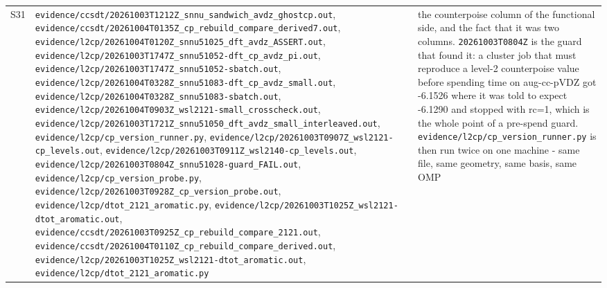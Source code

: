 \documentclass[11pt]{article}
\begin{document}
\begin{longtable}{c>{\raggedright\arraybackslash}p{}>{\raggedright\arraybackslash}p{}}
S31 & \texttt{evidence/\allowbreak{}ccsdt/\allowbreak{}20261003T1212Z\_\allowbreak{}snnu\_\allowbreak{}sandwich\_\allowbreak{}avdz\_\allowbreak{}ghostcp.out}, \texttt{evidence/\allowbreak{}ccsdt/\allowbreak{}20261004T0135Z\_\allowbreak{}cp\_\allowbreak{}rebuild\_\allowbreak{}compare\_\allowbreak{}derived7.out}, \texttt{evidence/\allowbreak{}l2cp/\allowbreak{}20261004T0120Z\_\allowbreak{}snnu51025\_\allowbreak{}dft\_\allowbreak{}avdz\_\allowbreak{}ASSERT.out}, \texttt{evidence/\allowbreak{}l2cp/\allowbreak{}20261003T1747Z\_\allowbreak{}snnu51052-dft\_\allowbreak{}cp\_\allowbreak{}avdz\_\allowbreak{}pi.out}, \texttt{evidence/\allowbreak{}l2cp/\allowbreak{}20261003T1747Z\_\allowbreak{}snnu51052-sbatch.out}, \texttt{evidence/\allowbreak{}l2cp/\allowbreak{}20261004T0328Z\_\allowbreak{}snnu51083-dft\_\allowbreak{}cp\_\allowbreak{}avdz\_\allowbreak{}small.out}, \texttt{evidence/\allowbreak{}l2cp/\allowbreak{}20261004T0328Z\_\allowbreak{}snnu51083-sbatch.out}, \texttt{evidence/\allowbreak{}l2cp/\allowbreak{}20261004T0903Z\_\allowbreak{}wsl2121-small\_\allowbreak{}crosscheck.out}, \texttt{evidence/\allowbreak{}l2cp/\allowbreak{}20261003T1721Z\_\allowbreak{}snnu51050\_\allowbreak{}dft\_\allowbreak{}avdz\_\allowbreak{}small\_\allowbreak{}interleaved.out}, \texttt{evidence/\allowbreak{}l2cp/\allowbreak{}cp\_\allowbreak{}version\_\allowbreak{}runner.py}, \texttt{evidence/\allowbreak{}l2cp/\allowbreak{}20261003T0907Z\_\allowbreak{}wsl2121-cp\_\allowbreak{}levels.out}, \texttt{evidence/\allowbreak{}l2cp/\allowbreak{}20261003T0911Z\_\allowbreak{}wsl2140-cp\_\allowbreak{}levels.out}, \texttt{evidence/\allowbreak{}l2cp/\allowbreak{}20261003T0804Z\_\allowbreak{}snnu51028-guard\_\allowbreak{}FAIL.out}, \texttt{evidence/\allowbreak{}l2cp/\allowbreak{}cp\_\allowbreak{}version\_\allowbreak{}probe.py}, \texttt{evidence/\allowbreak{}l2cp/\allowbreak{}20261003T0928Z\_\allowbreak{}cp\_\allowbreak{}version\_\allowbreak{}probe.out}, \texttt{evidence/\allowbreak{}l2cp/\allowbreak{}dtot\_\allowbreak{}2121\_\allowbreak{}aromatic.py}, \texttt{evidence/\allowbreak{}l2cp/\allowbreak{}20261003T1025Z\_\allowbreak{}wsl2121-dtot\_\allowbreak{}aromatic.out}, \texttt{evidence/\allowbreak{}ccsdt/\allowbreak{}20261003T0925Z\_\allowbreak{}cp\_\allowbreak{}rebuild\_\allowbreak{}compare\_\allowbreak{}2121.out}, \texttt{evidence/\allowbreak{}ccsdt/\allowbreak{}20261004T0110Z\_\allowbreak{}cp\_\allowbreak{}rebuild\_\allowbreak{}compare\_\allowbreak{}derived.out}, \texttt{evidence/\allowbreak{}l2cp/\allowbreak{}20261003T1025Z\_\allowbreak{}wsl2121-dtot\_\allowbreak{}aromatic.out}, \texttt{evidence/\allowbreak{}l2cp/\allowbreak{}dtot\_\allowbreak{}2121\_\allowbreak{}aromatic.py} & the counterpoise column of the functional side, and the fact that it was two columns. \texttt{20261003T0804Z} is the guard that found it: a cluster job that must reproduce a level-2 counterpoise value before spending time on aug-cc-pVDZ got -6.1526 where it was told to expect -6.1290 and stopped with rc=1, which is the whole point of a pre-spend guard. \texttt{evidence/\allowbreak{}l2cp/\allowbreak{}cp\_\allowbreak{}version\_\allowbreak{}runner.py} is then run twice on one machine - same file, same geometry, same basis, same OMP 
\end{longtable}
\end{document}
